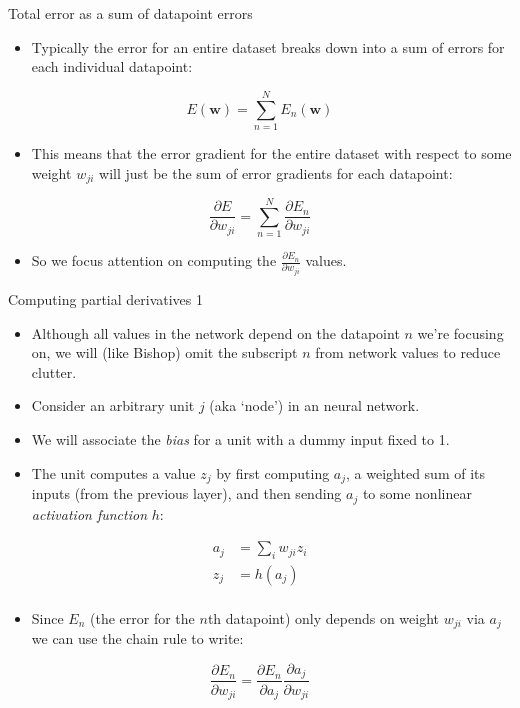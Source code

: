 \documentclass[10pt]{beamer}
\begin{document}
\begin{titledslide}{Total error as a sum of datapoint errors}

  \begin{itemize}
  \item Typically the error for an entire dataset breaks down into a
    sum of errors for each individual datapoint:
  \end{itemize}
  \[
    E(\mathbf{w}) = \sum_{n=1}^{N}E_{n}(\mathbf{w})
  \]
  \begin{itemize}
  \item This means that the error gradient for the entire dataset with
    respect to some weight $w_{ji}$ will just be the sum of error
    gradients for each datapoint: 
  \end{itemize}
  \[
    \frac{\partial E}{\partial w_{ji}} = \sum_{n=1}^{N}\frac{\partial E_{n}}{\partial w_{ji}}
  \]
  \begin{itemize}
  \item So we focus attention on computing the $\frac{\partial
      E_{n}}{\partial w_{ji}}$ values.
  \end{itemize}
\end{titledslide}
\begin{titledslide}{Computing partial derivatives 1}

  \begin{itemize}
  \item Although all values in the network depend on the datapoint $n$
    we're focusing on, we will (like Bishop) omit the subscript $n$ from network
    values to reduce clutter.
  \item Consider an arbitrary unit $j$ (aka `node') in an neural
    network.
  \item We will associate the \emph{bias} for a unit with a dummy
    input fixed to 1.
  \item The unit computes a value $z_j$ by first computing $a_j$, a weighted sum of its
    inputs (from the previous layer), and then sending $a_j$ to some nonlinear
    \emph{activation function} $h$:
  \end{itemize}
  \begin{align}
    \label{eq:preact}
    a_{j} & = \sum_{i}w_{ji}z_{i} \\
    \label{eq:act}
    z_{j} & = h(a_{j}) \\
  \end{align}
  \begin{itemize}
  \item Since $E_n$ (the error for the $n$th datapoint) only depends on
    weight $w_{ji}$ via $a_{j}$ we can use the chain rule to write:
  \end{itemize}
  \[
    \frac{\partial E_{n}}{\partial w_{ji}} =     \frac{\partial E_{n}}{\partial a_{j}}\frac{\partial a_{j}}{\partial w_{ji}}
  \]
  
\end{titledslide}
\end{document}
